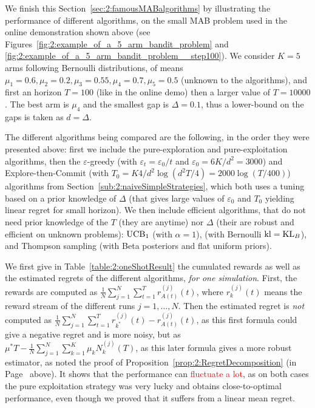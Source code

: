 
We finish this Section~\ref{sec:2:famousMABalgorithms} by illustrating the performance of different algorithms, on the small MAB problem used in the online demonstration shown above (see Figures~\ref{fig:2:example_of_a_5_arm_bandit_problem} and \ref{fig:2:example_of_a_5_arm_bandit_problem__step100}).
We consider $K=5$ arms following Bernoulli distributions, of means $\mu_1=0.6,\mu_2=0.2,\mu_3=0.55,\mu_4=0.7,\mu_5=0.5$ (unknown to the algorithms), and first an horizon $T=100$ (like in the online demo) then a larger value of $T=10000$.
The best arm is $\mu_4$ and the smallest gap is $\Delta = 0.1$, thus a lower-bound on the gaps is taken as $d=\Delta$.

The different algorithms being compared are the following, in the order they were presented above:
%
first we include the pure-exploration and
pure-exploitation algorithms,
then the $\varepsilon$-greedy (with $\varepsilon_t=\varepsilon_0/t$ and $\varepsilon_0=6K/d^2=3000$) and
Explore-then-Commit (with $T_0=K4/d^2 \log(d^2T/4)=2000\log(T/400)$) algorithms
from Section~\ref{sub:2:naiveSimpleStrategies}, which both uses a tuning based on a prior knowledge of $\Delta$ (that gives large values of $\varepsilon_0$ and $T_0$ yielding linear regret for small horizon).
%
We then include efficient algorithms, that do not need prior knowledge of the $T$ (they are anytime) nor $\Delta$ (their are robust and efficient on unknown problems):
$\mathrm{UCB}_1$ (with $\alpha=1$),
\klUCB{} (with Bernoulli $\mathrm{kl} = \mathrm{KL}_{B}$),
and Thompson sampling (with Beta posteriors and flat uniform priors).
%

We first give in Table~\ref{table:2:oneShotResult} the cumulated rewards as well as the estimated regrets of the different algorithms, \emph{for one simulation}.
First, the rewards are computed as $\frac{1}{N} \sum_{j=1}^N \sum_{t=1}^T r^{(j)}_{A(t)}(t)$, where $r^{(j)}_{k}(t)$ means the reward stream of the different runs $j=1,\dots,N$. Then the estimated regret is \emph{not} computed as $\frac{1}{N} \sum_{j=1}^N \sum_{t=1}^T r^{(j)}_{k^*}(t) - r^{(j)}_{A(t)}(t)$, as this first formula could give a negative regret and is more noisy, but as $\mu^* T - \frac{1}{N} \sum_{j=1}^N \sum_{k=1}^K \mu_k N^{(j)}_{k}(T)$, as this later formula gives a more robust estimator, as noted the proof of Proposition~\ref{prop:2:RegretDecomposition} (in Page~\pageref{remark:2:moreAccurateCountofRegretForSimulations} above).
%
It shows that the performance can \textcolor{red}{fluctuate a lot}, as on both cases the pure exploitation strategy was very lucky and obtains close-to-optimal performance, even though we proved that it suffers from a linear mean regret.

